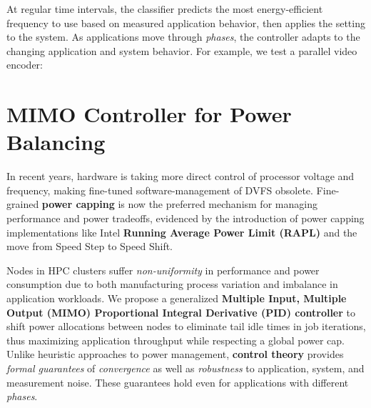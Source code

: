 \documentclass[a0,portrait]{a0poster}
\newcommand{\eg}{\textit{e.g., }}
\newcommand{\interface}[1]{\textbf{#1}}
\newcommand{\PAD}{\vskip 0.75cm}
\begin{document}
\begin{multicols}{2}
At regular time intervals, the classifier predicts the most energy-efficient frequency to use based on measured application behavior, then applies the setting to the system.
As applications move through \emph{phases}, the controller adapts to the changing application and system behavior.
For example, we test a parallel video encoder:

{
\PAD
\centering
      
  \label{fig:classifier-phases-x264-ee}
\PAD
}

\vfill\null
\columnbreak






\vspace{-1cm}
\section*{MIMO Controller for Power Balancing}

In recent years, hardware is taking more direct control of processor voltage and frequency, making fine-tuned software-management of DVFS obsolete.
Fine-grained \interface{power capping} is now the preferred mechanism for managing performance and power tradeoffs, evidenced by the introduction of power capping implementations like Intel \interface{Running Average Power Limit (RAPL)} and the move from Speed Step to Speed Shift.

Nodes in HPC clusters suffer \emph{non-uniformity} in performance and power consumption due to both manufacturing process variation and imbalance in application workloads.
We propose a generalized \interface{Multiple Input, Multiple Output (MIMO) Proportional Integral Derivative (PID) controller} to shift power allocations between nodes to eliminate tail idle times in job iterations, thus maximizing application throughput while respecting a global power cap.
Unlike heuristic approaches to power management, \textbf{control theory} provides \emph{formal guarantees} of \emph{convergence} as well as \emph{robustness} to application, system, and measurement noise.
These guarantees hold even for applications with different \emph{phases}.


\end{multicols}
\end{document}
